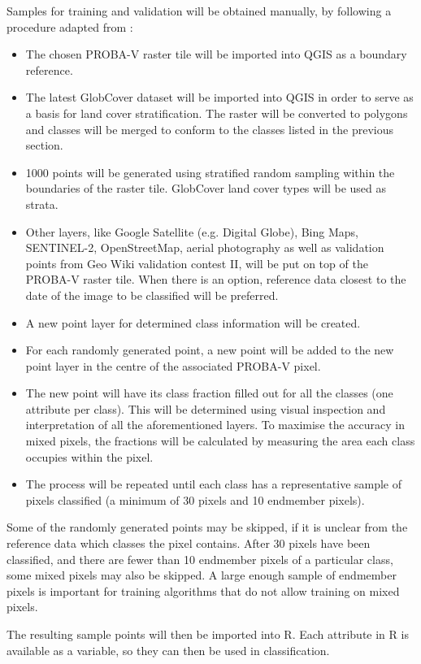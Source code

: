 \documentclass[a4paper,10pt]{article}
\begin{document}
Samples for training and validation will be obtained manually, by following a procedure adapted from \cite{defries1998training}:
\begin{itemize}
 \item The chosen PROBA-V raster tile will be imported into QGIS as a boundary reference.
 \item The latest GlobCover dataset will be imported into QGIS in order to serve as a basis for land cover stratification. The raster will be converted to polygons and classes will be merged to conform to the classes listed in the previous section.
 \item 1000 points will be generated using stratified random sampling within the boundaries of the raster tile. GlobCover land cover types will be used as strata.
 \item Other layers, like Google Satellite (e.g. Digital Globe), Bing Maps, SENTINEL-2, OpenStreetMap, aerial photography as well as validation points from Geo Wiki validation contest II, will be put on top of the PROBA-V raster tile. When there is an option, reference data closest to the date of the image to be classified will be preferred.
 \item A new point layer for determined class information will be created.
 \item For each randomly generated point, a new point will be added to the new point layer in the centre of the associated PROBA-V pixel.
 \item The new point will have its class fraction filled out for all the classes (one attribute per class). This will be determined using visual inspection and interpretation of all the aforementioned layers. To maximise the accuracy in mixed pixels, the fractions will be calculated by measuring the area each class occupies within the pixel.
 \item The process will be repeated until each class has a representative sample of pixels classified (a minimum of 30 pixels and 10 endmember pixels).
\end{itemize}

Some of the randomly generated points may be skipped, if it is unclear from the reference data which classes the pixel contains. After 30 pixels have been classified, and there are fewer than 10 endmember pixels of a particular class, some mixed pixels may also be skipped. A large enough sample of endmember pixels is important for training algorithms that do not allow training on mixed pixels.

The resulting sample points will then be imported into R. Each attribute in R is available as a variable, so they can then be used in classification.
\end{document}
